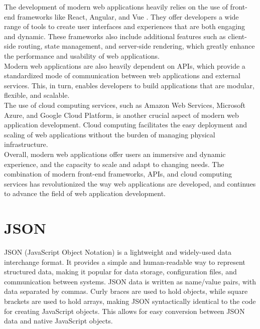 \noindent
The development of modern web applications heavily relies on the use of front-end frameworks like React, Angular, and Vue \cite{monocubed_popular_frameworks}. They offer developers a wide range of tools to create user interfaces and experiences that are both engaging and dynamic. These frameworks also include additional features such as client-side routing, state management, and server-side rendering, which greatly enhance the performance and usability of web applications. \\

\noindent
Modern web applications are also heavily dependent on APIs, which provide a standardized mode of communication between web applications and external services. \cite{forbes_modern_APIs} This, in turn, enables developers to build applications that are modular, flexible, and scalable. \\

\noindent
The use of cloud computing services, such as Amazon Web Services,  Microsoft Azure, and Google Cloud Platform, is another crucial aspect of modern web application development. Cloud computing facilitates the easy deployment and scaling of web applications without the burden of managing physical infrastructure. \\

\noindent
Overall, modern web applications offer users an immersive and dynamic experience, and the capacity to scale and adapt to changing needs. The combination of modern front-end frameworks, APIs, and cloud computing services has revolutionized the way web applications are developed, and continues to advance the field of web application development. \\

\section{JSON}

JSON (JavaScript Object Notation) is a lightweight and widely-used data interchange format. It provides a simple and human-readable way to represent structured data, making it popular for data storage, configuration files, and communication between systems. JSON data is written as name/value pairs, with data separated by commas. Curly braces are used to hold objects, while square brackets are used to hold arrays, making JSON syntactically identical to the code for creating JavaScript objects. \cite{W3Schools_JSON_format, ECMAScript_JSON_format} This allows for easy conversion between JSON data and native JavaScript objects. \\

